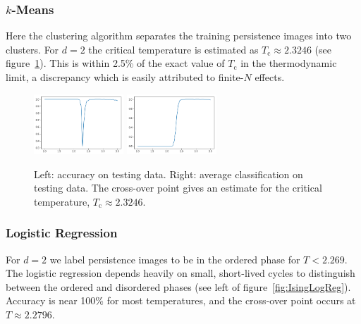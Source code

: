 \documentclass[11pt]{article}
\begin{document}
\newpage
\subsubsection{$k$-Means}
Here the clustering algorithm separates the training persistence images into two clusters. For $d=2$ the critical temperature is estimated as $T_\text{c}\approx 2.3246$ (see figure~\ref{ref:IsingKmeans}). This is within 2.5\% of the exact value of $T_\text{c}$ in the thermodynamic limit, a discrepancy which is easily attributed to finite-$N$ effects.

\begin{figure}[h]
    \centering
    \includegraphics[width=0.3\textwidth]{ising_images/kmeans_2d_ising}
    \includegraphics[width=0.3\textwidth]{ising_images/kmeans_avg_2d_ising}
    \caption{Left: accuracy on testing data. Right: average classification on testing data. The cross-over point gives an estimate for the critical temperature, $T_\text{c}\approx 2.3246$.}
    \label{ref:IsingKmeans}
\end{figure}


\subsubsection{Logistic Regression}
For $d=2$ we label persistence images to be in the ordered phase for $T<2.269$. The logistic regression depends heavily on small, short-lived cycles to distinguish between the ordered and disordered phases (see left of figure~\ref{fig:IsingLogReg}). Accuracy is near 100\% for most temperatures, and the cross-over point occurs at $T\approx 2.2796$.
\end{document}

